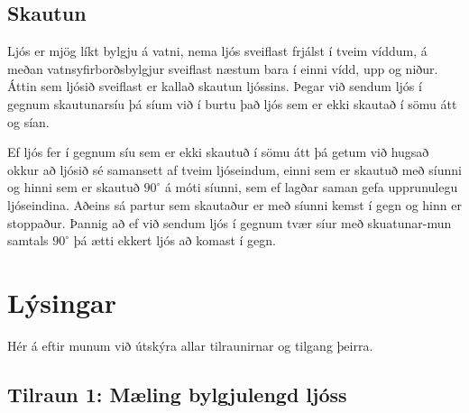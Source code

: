 \documentclass[12pt]{article}
\begin{document}
\subsection{Skautun}

Ljós er mjög líkt bylgju á vatni, nema ljós sveiflast frjálst í tveim víddum, á meðan vatnsyfirborðsbylgjur sveiflast næstum bara í einni vídd, upp og niður. Áttin sem ljósið sveiflast er kallað skautun ljóssins. Þegar við sendum ljós í gegnum skautunarsíu þá síum við í burtu það ljós sem er ekki skautað í sömu átt og sían.

Ef ljós fer í gegnum síu sem er ekki skautuð í sömu átt þá getum við hugsað okkur að ljósið sé samansett af tveim ljóseindum, einni sem er skautuð með síunni og hinni sem er skautuð $90^\circ$ á móti síunni, sem ef lagðar saman gefa upprunulegu ljóseindina. Aðeins sá partur sem skautaður er með síunni kemst í gegn og hinn er stoppaður. Þannig að ef við sendum ljós í gegnum tvær síur með skuatunar-mun samtals $90^\circ$ þá ætti ekkert ljós að komast í gegn.


\section{Lýsingar}

Hér á eftir munum við útskýra allar tilraunirnar og tilgang þeirra.

\subsection{Tilraun 1: Mæling bylgjulengd ljóss}
\end{document}
